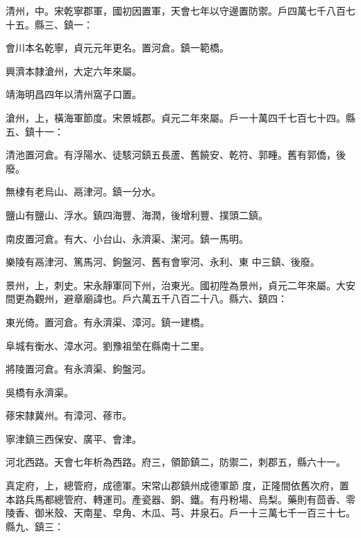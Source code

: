 \begin{pinyinscope}
 清州，中。宋乾寧郡軍，國初因置軍，天會七年以守邊置防禦。戶四萬七千八百七十五。縣三、鎮一：



 會川本名乾寧，貞元元年更名。置河倉。鎮一範橋。



 興濟本隸滄州，大定六年來屬。



 靖海明昌四年以清州窩子口置。



 滄州，上，橫海軍節度。宋景城郡。貞元二年來屬。戶一十萬四千七百七十四。縣五、鎮十一：



 清池置河倉。有浮陽水、徒駭河鎮五長蘆、舊饒安、乾符、郭畽。舊有郭僑，後廢。



 無棣有老烏山、鬲津河。鎮一分水。



 鹽山有鹽山、浮水。鎮四海豐、海潤，後增利豐、撲頭二鎮。



 南皮置河倉。有大、小台山、永濟渠、潔河。鎮一馬明。



 樂陵有鬲津河、篤馬河、鉤盤河、舊有會寧河、永利、東
 中三鎮、後廢。



 景州，上，刺史。宋永靜軍同下州，治東光。國初陞為景州，貞元二年來屬。大安間更為觀州，避章廟諱也。戶六萬五千八百二十八。縣六、鎮四：



 東光倚。置河倉。有永濟渠、漳河。鎮一建橋。



 阜城有衡水、漳水河。劉豫祖塋在縣南十二里。



 將陵置河倉。有永濟渠、鉤盤河。



 吳橋有永濟渠。



 蓚宋隸冀州。有漳河、蓚市。



 寧津鎮三西保安、廣平、會津。



 河北西路。天會七年析為西路。府三，領節鎮二，防禦二，刺郡五，縣六十一。



 真定府，上，總管府，成德軍。宋常山郡鎮州成德軍節
 度，正隆間依舊次府，置本路兵馬都總管府、轉運司。產瓷器、銅、鐵。有丹粉場、烏梨。藥則有茴香、零陵香、御米殼、天南星、皁角、木瓜、芎、井泉石。戶一十三萬七千一百三十七。縣九、鎮三：




\end{pinyinscope}
